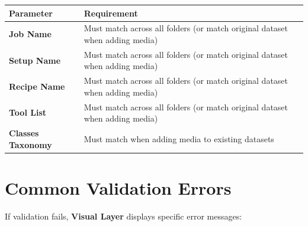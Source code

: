 \documentclass[
  11pt,
  a4paper,
  11pt,
  oneside]{report}
\renewcommand{\toprule}{\hline}
\renewcommand{\midrule}{\hline}
\renewcommand{\bottomrule}{\hline}
\begin{document}
\begin{longtable}[]{@{}
  >{\raggedright\arraybackslash}p{}
  >{\raggedright\arraybackslash}p{}@{}}
\toprule\noalign{}
\begin{minipage}[b]{\linewidth}\raggedright
\textbf{Parameter}
\end{minipage} & \begin{minipage}[b]{\linewidth}\raggedright
\textbf{Requirement}
\end{minipage} \\
\midrule\noalign{}
\endhead
\bottomrule\noalign{}
\endlastfoot
\textbf{Job Name} & Must match across all folders (or match original
dataset when adding media) \\
\textbf{Setup Name} & Must match across all folders (or match original
dataset when adding media) \\
\textbf{Recipe Name} & Must match across all folders (or match original
dataset when adding media) \\
\textbf{Tool List} & Must match across all folders (or match original
dataset when adding media) \\
\textbf{Classes Taxonomy} & Must match when adding media to existing
datasets \\
\end{longtable}

\section{Common Validation Errors}\label{common-validation-errors}

If validation fails, \textbf{Visual Layer} displays specific error
messages:
\end{document}
